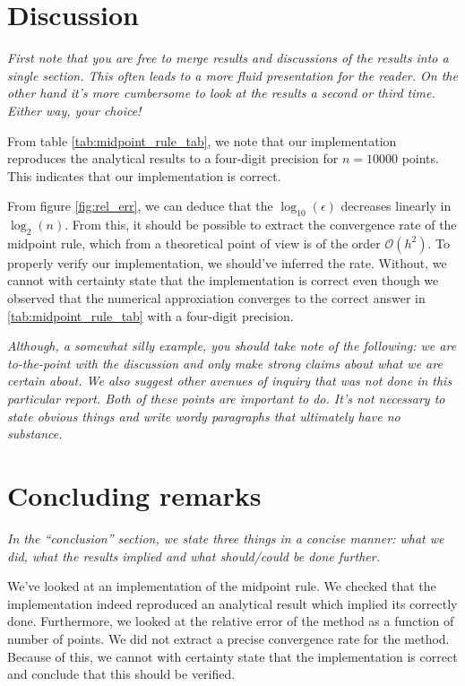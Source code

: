 \documentclass[english,notitlepage, reprint]{revtex4-1}  %
\begin{document}
\section{Discussion}\label{sec:discussion}
\textit{First note that you are free to merge results and discussions of the results into a single section. This often leads to a more fluid presentation for the reader. On the other hand it's more cumbersome to look at the results a second or third time. Either way, your choice!}

From table \ref{tab:midpoint_rule_tab}, we note that our implementation reproduces the analytical results to a four-digit precision for $n = 10000$ points. This indicates that our implementation is correct.

From figure \ref{fig:rel_err}, we can deduce that the $\log_{10}(\epsilon)$ decreases linearly in $\log_{2}(n)$. From this, it should be possible to extract the convergence rate of the midpoint rule, which from a theoretical point of view is of the order $\mathcal{O}(h^2)$. To properly verify our implementation, we should've inferred the rate. Without, we cannot with certainty state that the implementation is correct even though we observed that the numerical approxiation converges to the correct answer in \ref{tab:midpoint_rule_tab} with a four-digit precision.

\textit{Although, a somewhat silly example, you should take note of the following: we are to-the-point with the discussion and only make strong claims about what we are certain about. We also suggest other avenues of inquiry that was not done in this particular report. Both of these points are important to do. It's not necessary to state obvious things and write wordy paragraphs that ultimately have no substance.}

\section{Concluding remarks}\label{sec:conclusion}
\textit{In the ``conclusion'' section, we state three things in a concise manner: what we did, what the results implied and what should/could be done further.} 

We've looked at an implementation of the midpoint rule. We checked that the implementation indeed reproduced an analytical result which implied its correctly done. Furthermore, we looked at the relative error of the method as a function of number of points. We did not extract a precise convergence rate for the method. Because of this, we cannot with certainty state that the implementation is correct and conclude that this should be verified.
\onecolumngrid
%

	
	
\end{document}
